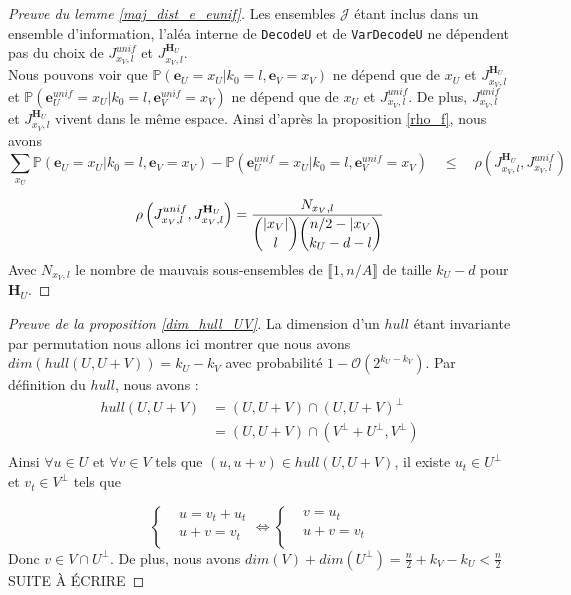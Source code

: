 \documentclass[12pt]{article}
\theoremstyle{plain}
\newcommand{\e}{\mathbf{e}}
\newcommand{\J}{\mathcal{J}}
\begin{document}
\begin{proof}[Preuve du lemme \ref{maj_dist_e_eunif}]
\noindent Les ensembles $\J$ étant inclus dans un ensemble d'information, l'aléa interne de \verb|DecodeU| et de \verb|VarDecodeU| ne dépendent pas du choix de $J_{x_V,l}^{unif}$ et $J_{x_V, l}^{\mathbf{H}_U}$. \\
Nous pouvons voir que $\mathbb{P}(\e_U=x_U|k_0 = l,\e_V=x_V)$ ne dépend que de $x_U$ et $J_{x_V, l}^{\mathbf{H}_U}$ et   $\mathbb{P}(\e_U^{unif}=x_U |k_0 = l, \e_V^{unif}=x_V)$ ne dépend que de $x_U$ et $J_{x_V, l}^{unif}$. 
De plus, $J_{x_V,l}^{unif}$ et $J_{x_V, l}^{\mathbf{H}_U}$ vivent dans le même espace.
Ainsi d'après la proposition \ref{rho_f}, nous avons 
{\scriptsize
$$ \sum\limits_{x_U}\mathbb{P}(\e_U=x_U|k_0 = l,\e_V=x_V) - \mathbb{P}(\e_U^{unif}=x_U |k_0 = l, \e_V^{unif}=x_V)\quad \leq\quad \rho(J_{x_V, l}^{\mathbf{H}_U},J_{x_V, l}^{unif})$$
}


\begin{equation}
\rho\left(J_{x_V,l}^{unif},J_{x_V, l}^{\mathbf{H}_U}\right) = \frac{N_{x_V,l}}{\dbinom{|x_V|}{l}\dbinom{n/2-|x_V}{k_U-d-l}}
\end{equation}
Avec $N_{x_V,l}$ le nombre de mauvais sous-ensembles de $\llbracket1,n/A\rrbracket$ de taille $k_U-d$ pour $\mathbf{H}_U$.
\end{proof}


\begin{proof}[Preuve de la proposition \ref{dim_hull_UV}]
La dimension d'un $hull$ étant invariante par permutation nous allons ici montrer que nous avons $dim(hull(U,U+V)) = k_U - k_V$ avec probabilité $1-\mathcal{O}(2^{k_U-k_V})$.
Par définition du $hull$, nous avons :
\begin{equation*}
\begin{split}
hull(U,U+V) &= (U,U+V) \cap (U,U+V)^{\bot } \\
&= (U,U+V) \cap (V^{\bot}+U^{\bot}, V^{\bot}) \\
\end{split}
\end{equation*} 
Ainsi $\forall u\in U$ et $\forall v\in V$ tels que $(u,u+v)\in hull(U,U+V)$, il existe $u_t\in U^{\bot}$ et $v_t\in V^{\bot}$ tels que

\begin{equation*}
\left\{
\begin{aligned}
&u = v_t + u_t\\
&u + v = v_t\\
\end{aligned}
\right.
\iff
\left\{
\begin{aligned}
&v = u_t\\
&u + v = v_t\\
\end{aligned}
\right.
\end{equation*}
Donc $v\in V\cap U^{\bot}$.
De plus, nous avons $dim(V) + dim(U^{\bot}) = \frac{n}{2} +k_V - k_U < \frac{n}{2}$
SUITE À ÉCRIRE
\end{proof}



\end{document}
